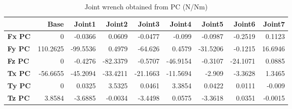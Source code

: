 \begin{table}[h!]
	\centering
	\caption{Joint wrench obtained from PC (N/Nm)}
	\label{wrech_PC_Pose13}
	\begin{tabular}{|l|r|r|r|r|r|r|r|r|}
		\hline
		\textbf{}  & \textbf{Base} & \textbf{Joint1}  & \textbf{Joint2}  & \textbf{Joint3}  & \textbf{Joint4}  & \textbf{Joint5}  & \textbf{Joint6}  & \textbf{Joint7} \\ \hline
		\textbf{Fx PC}  & 0        & -0.0366        & 0.0609        & -0.0477        & -0.099        & -0.0987        & -0.2519        & 0.1123 \\ \hline
		\textbf{Fy PC}  & 110.2625        & -99.5536        & 0.4979        & -64.626        & 0.4579        & -31.5206        & -0.1215        & 16.6946 \\ \hline
		\textbf{Fz PC}  & 0        & -0.4276        & -82.3379        & -0.5707        & -46.9154        & -0.3107        & -24.1071        & 0.0885 \\ \hline
		\textbf{Tx PC}  & -56.6655        & -45.2094        & -33.4211        & -21.1663        & -11.5694        & -2.909        & -3.3628        & 1.3465 \\ \hline
		\textbf{Ty PC}  & 0        & 0.0325        & 3.5325        & 0.0461        & 3.3854        & 0.0422        & 0.0111        & -0.009 \\ \hline
		\textbf{Tz PC}  & 3.8584        & -3.6885        & -0.0034        & -3.4498        & 0.0575        & -3.3618        & 0.0351        & -0.0015 \\ \hline
	\end{tabular}
\end{table}

